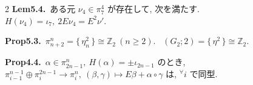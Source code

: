\documentclass[10pt, leqno]{ltjsarticle}
\newcommand{\gen}[1]{\{\,#1\,\}}       %
\newcommand{\pit}[2]{\pi_{#1}^{#2}}
\numberwithin{equation}{section}
\theoremstyle{plain}
\theoremstyle{definition}
\theoremstyle{remark}
\begin{document}
\begin{paracol}{2}
\noindent
\textbf{Lem5.4.}\
ある元 \(\nu_{4}\in \pi^{4}_{7}\) が存在して, 次を満たす. \\
\(H(\nu_{4})=\iota_7,\ 2E \nu_{4}=E^{2}\nu' .\)

\noindent
\textbf{Prop5.3.}\
\(\pi^{n}_{n+2}=\gen{\eta_n^{2}}\cong \mathbb Z_2\ (n\ge2).\) \
\((G_2;2)=\gen{\eta^{2}}\cong \mathbb Z_2 .\)

\noindent
\textbf{Prop4.4.}\
\(\alpha\in \pit{2n-1}{n},\ H(\alpha)=\pm\iota_{2n-1}\) のとき,\\
\(\pit{i-1}{n-1}\oplus\pit{i}{2n-1}\to\pit{i}{n},\ 
(\beta, \gamma)\mapsto E\beta+ \alpha\circ\gamma\)
は, \({}^\forall i\) で同型.





\end{paracol}
\end{document}
